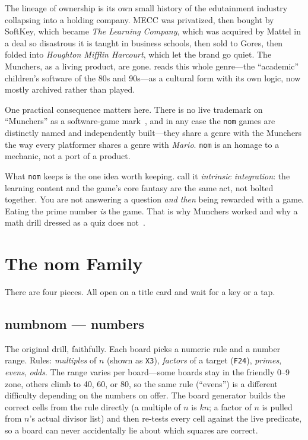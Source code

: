 \documentclass[10pt,letterpaper,twocolumn]{article}
\begin{document}
The lineage of ownership is its own small history of the edutainment industry collapsing into a holding company. MECC was privatized, then bought by SoftKey, which became \emph{The Learning Company}, which was acquired by Mattel in a deal so disastrous it is taught in business schools, then sold to Gores, then folded into \emph{Houghton Mifflin Harcourt}, which let the brand go quiet. The Munchers, as a living product, are gone. \citet{ito2009engineering} reads this whole genre---the ``academic'' children's software of the 80s and 90s---as a cultural form with its own logic, now mostly archived rather than played.

One practical consequence matters here. There is no live trademark on ``Munchers'' as a software-game mark~\citep{uspto2024munchers}, and in any case the \texttt{nom} games are distinctly named and independently built---they share a genre with the Munchers the way every platformer shares a genre with \emph{Mario}. \texttt{nom} is an homage to a mechanic, not a port of a product.

What \texttt{nom} keeps is the one idea worth keeping. \citet{habgood2011motivating} call it \emph{intrinsic integration}: the learning content and the game's core fantasy are the same act, not bolted together. You are not answering a question \emph{and then} being rewarded with a game. Eating the prime number \emph{is} the game. That is why Munchers worked and why a math drill dressed as a quiz does not~\citep{malone1981thinking}.

\section{The nom Family}

There are four pieces. All open on a title card and wait for a key or a tap.

\subsection{numbnom --- numbers}

The original drill, faithfully. Each board picks a numeric rule and a number range. Rules: \emph{multiples} of $n$ (shown as \texttt{X3}), \emph{factors} of a target (\texttt{F24}), \emph{primes}, \emph{evens}, \emph{odds}. The range varies per board---some boards stay in the friendly 0--9 zone, others climb to 40, 60, or 80, so the same rule (``evens'') is a different difficulty depending on the numbers on offer. The board generator builds the correct cells from the rule directly (a multiple of $n$ is $kn$; a factor of $n$ is pulled from $n$'s actual divisor list) and then re-tests every cell against the live predicate, so a board can never accidentally lie about which squares are correct.
\end{document}
